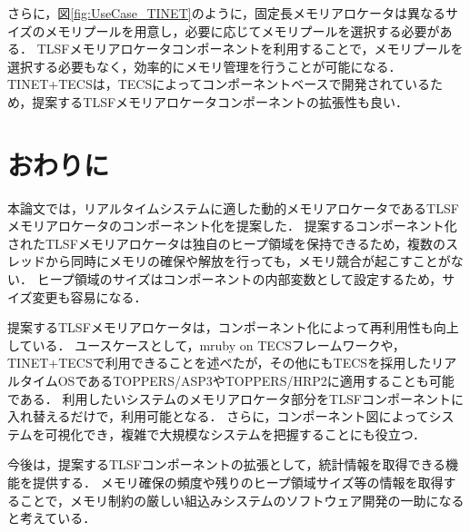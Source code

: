 \documentclass[submit,techrep]{ipsj_v2/UTF8/ipsj}
\begin{document}
さらに，図\ref{fig:UseCase_TINET}のように，固定長メモリアロケータは異なるサイズのメモリプールを用意し，必要に応じてメモリプールを選択する必要がある．
TLSFメモリアロケータコンポーネントを利用することで，メモリプールを選択する必要もなく，効率的にメモリ管理を行うことが可能になる．
TINET+TECSは，TECSによってコンポーネントベースで開発されているため，提案するTLSFメモリアロケータコンポーネントの拡張性も良い．


\section{おわりに}
\label{sec:Conclusion}

本論文では，リアルタイムシステムに適した動的メモリアロケータであるTLSFメモリアロケータのコンポーネント化を提案した．
提案するコンポーネント化されたTLSFメモリアロケータは独自のヒープ領域を保持できるため，複数のスレッドから同時にメモリの確保や解放を行っても，メモリ競合が起こすことがない．
ヒープ領域のサイズはコンポーネントの内部変数として設定するため，サイズ変更も容易になる．

提案するTLSFメモリアロケータは，コンポーネント化によって再利用性も向上している．
ユースケースとして，mruby on TECSフレームワークや，TINET+TECSで利用できることを述べたが，その他にもTECSを採用したリアルタイムOSであるTOPPERS/ASP3\cite{par:ASP3}やTOPPERS/HRP2\cite{par:hr-tecs}に適用することも可能である．
利用したいシステムのメモリアロケータ部分をTLSFコンポーネントに入れ替えるだけで，利用可能となる．
さらに，コンポーネント図によってシステムを可視化でき，複雑で大規模なシステムを把握することにも役立つ．

今後は，提案するTLSFコンポーネントの拡張として，統計情報を取得できる機能を提供する．
メモリ確保の頻度や残りのヒープ領域サイズ等の情報を取得することで，メモリ制約の厳しい組込みシステムのソフトウェア開発の一助になると考えている．




\end{document}
